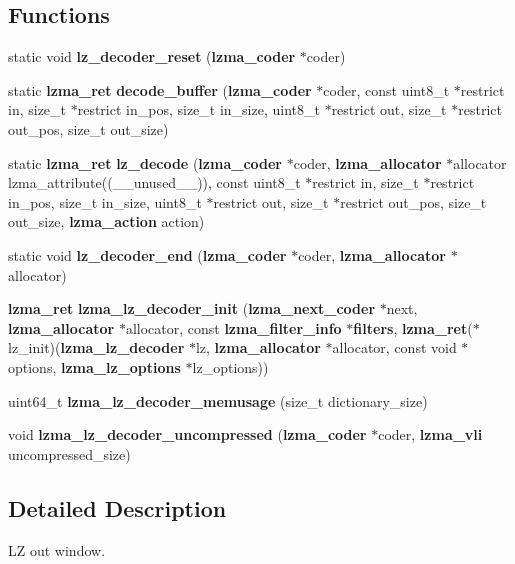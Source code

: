 \subsection*{Functions}
\begin{DoxyCompactItemize}
\item 
static void {\bfseries lz\-\_\-decoder\-\_\-reset} ({\bf lzma\-\_\-coder} $\ast$coder)\label{lz__decoder_8c_a846b635a30e69070cf612edb6d937c06}

\item 
static {\bf lzma\-\_\-ret} {\bfseries decode\-\_\-buffer} ({\bf lzma\-\_\-coder} $\ast$coder, const uint8\-\_\-t $\ast$restrict in, size\-\_\-t $\ast$restrict in\-\_\-pos, size\-\_\-t in\-\_\-size, uint8\-\_\-t $\ast$restrict out, size\-\_\-t $\ast$restrict out\-\_\-pos, size\-\_\-t out\-\_\-size)\label{lz__decoder_8c_a422ae264c308820bc1e19499aa4460be}

\item 
static {\bf lzma\-\_\-ret} {\bfseries lz\-\_\-decode} ({\bf lzma\-\_\-coder} $\ast$coder, {\bf lzma\-\_\-allocator} $\ast$allocator lzma\-\_\-attribute((\-\_\-\-\_\-unused\-\_\-\-\_\-)), const uint8\-\_\-t $\ast$restrict in, size\-\_\-t $\ast$restrict in\-\_\-pos, size\-\_\-t in\-\_\-size, uint8\-\_\-t $\ast$restrict out, size\-\_\-t $\ast$restrict out\-\_\-pos, size\-\_\-t out\-\_\-size, {\bf lzma\-\_\-action} action)\label{lz__decoder_8c_a43507bab85f523980155990d8dcb9b9a}

\item 
static void {\bfseries lz\-\_\-decoder\-\_\-end} ({\bf lzma\-\_\-coder} $\ast$coder, {\bf lzma\-\_\-allocator} $\ast$allocator)\label{lz__decoder_8c_adaedc4afa2e3b925288c8ecb0bbb4746}

\item 
{\bf lzma\-\_\-ret} {\bfseries lzma\-\_\-lz\-\_\-decoder\-\_\-init} ({\bf lzma\-\_\-next\-\_\-coder} $\ast$next, {\bf lzma\-\_\-allocator} $\ast$allocator, const {\bf lzma\-\_\-filter\-\_\-info} $\ast${\bf filters}, {\bf lzma\-\_\-ret}($\ast$lz\-\_\-init)({\bf lzma\-\_\-lz\-\_\-decoder} $\ast$lz, {\bf lzma\-\_\-allocator} $\ast$allocator, const void $\ast$options, {\bf lzma\-\_\-lz\-\_\-options} $\ast$lz\-\_\-options))\label{lz__decoder_8c_a3a98cb00f0b1d5e5d8d4e8daa7375d05}

\item 
uint64\-\_\-t {\bfseries lzma\-\_\-lz\-\_\-decoder\-\_\-memusage} (size\-\_\-t dictionary\-\_\-size)\label{lz__decoder_8c_aa715866ca37ce5fd726c391b0da5b882}

\item 
void {\bfseries lzma\-\_\-lz\-\_\-decoder\-\_\-uncompressed} ({\bf lzma\-\_\-coder} $\ast$coder, {\bf lzma\-\_\-vli} uncompressed\-\_\-size)\label{lz__decoder_8c_a1c90ae360afade0460f2015d210ec4e8}

\end{DoxyCompactItemize}


\subsection{Detailed Description}
L\-Z out window. 